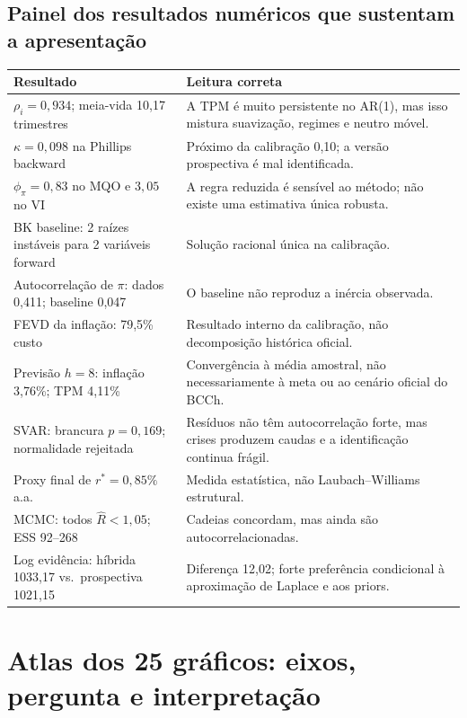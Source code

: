 \documentclass[11pt,a4paper]{article}
\begin{document}
\subsection{Painel dos resultados numéricos que sustentam a apresentação}
\begin{center}\small
\begin{tabularx}{\textwidth}{@{}p{}X@{}}
\toprule
\textbf{Resultado} & \textbf{Leitura correta} \\
\midrule
$\rho_i=0{,}934$; meia-vida 10,17 trimestres & A TPM é muito persistente no AR(1), mas isso mistura
suavização, regimes e neutro móvel. \\
$\kappa=0{,}098$ na Phillips backward & Próximo da calibração 0,10; a versão prospectiva é mal
identificada. \\
$\phi_\pi=0{,}83$ no MQO e $3{,}05$ no VI & A regra reduzida é sensível ao método; não existe uma
estimativa única robusta. \\
BK baseline: 2 raízes instáveis para 2 variáveis forward & Solução racional única na calibração. \\
Autocorrelação de $\pi$: dados 0,411; baseline 0,047 & O baseline não reproduz a inércia observada. \\
FEVD da inflação: 79,5\% custo & Resultado interno da calibração, não decomposição histórica oficial. \\
Previsão $h=8$: inflação 3,76\%; TPM 4,11\% & Convergência à média amostral, não necessariamente à
meta ou ao cenário oficial do BCCh. \\
SVAR: brancura $p=0{,}169$; normalidade rejeitada & Resíduos não têm autocorrelação forte, mas crises
produzem caudas e a identificação continua frágil. \\
Proxy final de $r^\ast=0{,}85\%$ a.a. & Medida estatística, não Laubach--Williams estrutural. \\
MCMC: todos $\hat R<1{,}05$; ESS 92--268 & Cadeias concordam, mas ainda são autocorrelacionadas. \\
Log evidência: híbrida 1033,17 vs.\ prospectiva 1021,15 & Diferença 12,02; forte preferência
condicional à aproximação de Laplace e aos priors. \\
\bottomrule
\end{tabularx}
\end{center}

\section{Atlas dos 25 gráficos: eixos, pergunta e interpretação}
\end{document}
